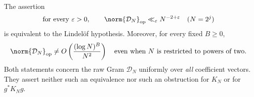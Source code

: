 \begin{proposition}
\label{prop:v158-lindelof-budget}
The assertion
\begin{equation}
 \text{for every }\varepsilon>0,\qquad
 \norm{\mathcal D_N}_{\rm op}\ll_\varepsilon N^{-2+\varepsilon}
 \quad(N=2^j)
 \label{eq:v158-near-scale-budget}
\end{equation}
is equivalent to the Lindel\"of hypothesis. Moreover, for every fixed
$B\geq0$,
\begin{equation}
 \norm{\mathcal D_N}_{\rm op}
 \ne O\left(\frac{(\log N)^B}{N^2}\right)
 \quad\text{even when }N\text{ is restricted to powers of two}.
 \label{eq:v158-no-log-budget}
\end{equation}
Both statements concern the raw Gram $\mathcal D_N$ uniformly over
\emph{all} coefficient vectors. They assert neither such an equivalence
nor such an obstruction for $K_N$ or for $g^*K_Ng$.
\end{proposition}
